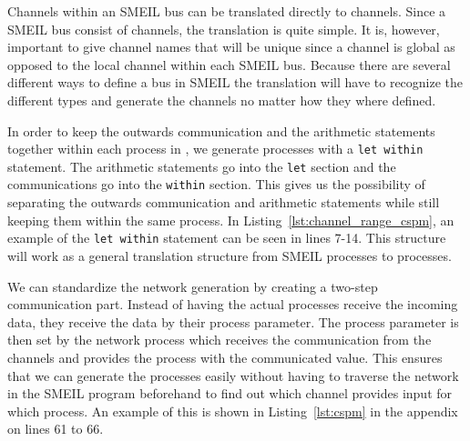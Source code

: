 
Channels within an SMEIL bus can be translated directly to \cspm{} channels. Since a SMEIL bus consist of channels, the translation is quite simple. It is, however, important to give channel names that will be unique since a \cspm{} channel is global as opposed to the local channel within each SMEIL bus. Because there are several different ways to define a bus in SMEIL %
the translation will have to recognize the different types and generate the \cspm channels no matter how they where defined.




In order to keep the outwards communication and the arithmetic statements together within each process in \cspm{}, we generate \cspm{} processes with a \texttt{let within} statement. The arithmetic statements go into the \texttt{let} section and the communications go into the \texttt{within} section. This gives us the possibility of separating the outwards communication and arithmetic statements while still keeping them within the same \cspm{} process. In Listing~\ref{lst:channel_range_cspm}, an example of the \texttt{let within} statement can be seen in lines 7-14. This structure will work as a general translation structure from SMEIL processes to \cspm{} processes.

We can standardize the network generation by creating a two-step communication part. Instead of having the actual processes receive the incoming data, they receive the data by their process parameter. The process parameter is then set by the network process which receives the communication from the channels and provides the process with the communicated value.
This ensures that we can generate the processes easily without having to traverse the network in the SMEIL program beforehand to find out which channel provides input for which process. An example of this is shown in Listing~\ref{lst:cspm} in the appendix on lines 61 to 66.


